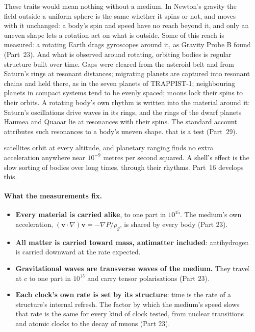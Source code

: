 \documentclass[11pt,a4paper]{article}
\begin{document}
These traits would mean nothing without a medium. In Newton's gravity the field outside a uniform sphere is the same whether it spins or not, and moves with it unchanged: a body's spin and speed have no reach beyond it, and only an uneven shape lets a rotation act on what is outside.  Some of this reach is measured: a rotating Earth drags gyroscopes around it, as Gravity Probe B found (Part~23). And what is observed around rotating, orbiting bodies is regular structure built over time. Gaps were cleared from the asteroid belt and from Saturn's rings at resonant distances; migrating planets are captured into resonant chains and held there, as in the seven planets of TRAPPIST-1; neighbouring planets in compact systems tend to be evenly spaced; moons lock their spins to their orbits. A rotating body's own rhythm is written into the material around it: Saturn's oscillations drive waves in its rings, and the rings of the dwarf planets Haumea and Quaoar lie at resonances with their spins. The standard account attributes such resonances to a body's uneven shape.  that is a test (Part~29).

 satellites orbit at every altitude, and planetary ranging finds no extra acceleration anywhere near $10^{-9}$ metres per second squared. A shell's effect is the slow sorting of bodies over long times, through their rhythms.  Part~16 develops this.

\paragraph{What the measurements fix.}
\begin{itemize}
\item \textbf{Every material is carried alike}, to one part in $10^{15}$. The medium's own acceleration, $(\mathbf{v}\cdot\nabla)\mathbf{v} = -\nabla P/\rho_g$, is shared by every body (Part 23).
\item \textbf{All matter is carried toward mass, antimatter included}: antihydrogen is carried downward at the rate expected.
\item \textbf{Gravitational waves are transverse waves of the medium.} They travel at $c$ to one part in $10^{15}$ and carry tensor polarisations (Part 23).
\item \textbf{Each clock's own rate is set by its structure}: time is the rate of a structure's internal refresh. The factor by which the medium's speed slows that rate is the same for every kind of clock tested, from nuclear transitions and atomic clocks to the decay of muons (Part 23).
\end{itemize}
\end{document}
